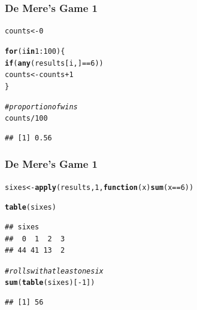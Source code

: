 \documentclass[12pt]{beamer}\usepackage[]{graphicx}\usepackage[]{color}
\makeatletter
\newcommand{\hlnum}[1]{\textcolor[rgb]{0.686,0.059,0.569}{#1}}%
\newcommand{\hlcom}[1]{\textcolor[rgb]{0.678,0.584,0.686}{\textit{#1}}}%
\newcommand{\hlopt}[1]{\textcolor[rgb]{0,0,0}{#1}}%
\newcommand{\hlstd}[1]{\textcolor[rgb]{0.345,0.345,0.345}{#1}}%
\newcommand{\hlkwa}[1]{\textcolor[rgb]{0.161,0.373,0.58}{\textbf{#1}}}%
\newcommand{\hlkwb}[1]{\textcolor[rgb]{0.69,0.353,0.396}{#1}}%
\newcommand{\hlkwc}[1]{\textcolor[rgb]{0.333,0.667,0.333}{#1}}%
\newcommand{\hlkwd}[1]{\textcolor[rgb]{0.737,0.353,0.396}{\textbf{#1}}}%
\newenvironment{kframe}{%
 \def\at@end@of@kframe{}%
 \ifinner\ifhmode%
  \def\at@end@of@kframe{\end{minipage}}%
  \begin{minipage}{\columnwidth}%
 \fi\fi%
 \def\FrameCommand##1{\hskip\@totalleftmargin \hskip-\fboxsep
 \colorbox{shadecolor}{##1}\hskip-\fboxsep
     \hskip-\linewidth \hskip-\@totalleftmargin \hskip\columnwidth}%
 \MakeFramed {\advance\hsize-\width
   \@totalleftmargin\z@ \linewidth\hsize
   \@setminipage}}%
 {\par\unskip\endMakeFramed%
 \at@end@of@kframe}
\newenvironment{knitrout}{}{} %
\makeatother
\begin{document}
\begin{frame}[fragile]
\frametitle{De Mere's Game 1}

\begin{knitrout}\footnotesize
{}\color{fgcolor}\begin{kframe}
\begin{alltt}
\hlstd{counts} \hlkwb{<-} \hlnum{0}

\hlkwa{for} \hlstd{(i} \hlkwa{in} \hlnum{1}\hlopt{:}\hlnum{100}\hlstd{) \{}
  \hlkwa{if} \hlstd{(}\hlkwd{any}\hlstd{(results[i, ]} \hlopt{==} \hlnum{6}\hlstd{))}
    \hlstd{counts} \hlkwb{<-} \hlstd{counts} \hlopt{+} \hlnum{1}
\hlstd{\}}

\hlcom{# proportion of wins}
\hlstd{counts} \hlopt{/} \hlnum{100}
\end{alltt}
\begin{verbatim}
## [1] 0.56
\end{verbatim}
\end{kframe}
\end{knitrout}

\end{frame}


\begin{frame}[fragile]
\frametitle{De Mere's Game 1}

\begin{knitrout}\footnotesize
{}\color{fgcolor}\begin{kframe}
\begin{alltt}
\hlstd{sixes} \hlkwb{<-} \hlkwd{apply}\hlstd{(results,} \hlnum{1}\hlstd{,} \hlkwa{function}\hlstd{(}\hlkwc{x}\hlstd{)} \hlkwd{sum}\hlstd{(x} \hlopt{==} \hlnum{6}\hlstd{))}

\hlkwd{table}\hlstd{(sixes)}
\end{alltt}
\begin{verbatim}
## sixes
##  0  1  2  3 
## 44 41 13  2
\end{verbatim}
\end{kframe}
\end{knitrout}

\pause
\begin{knitrout}\footnotesize
{}\color{fgcolor}\begin{kframe}
\begin{alltt}
\hlcom{# rolls with at least one six}
\hlkwd{sum}\hlstd{(}\hlkwd{table}\hlstd{(sixes)[}\hlopt{-}\hlnum{1}\hlstd{])}
\end{alltt}
\begin{verbatim}
## [1] 56
\end{verbatim}
\end{kframe}
\end{knitrout}

\end{frame}
\end{document}
